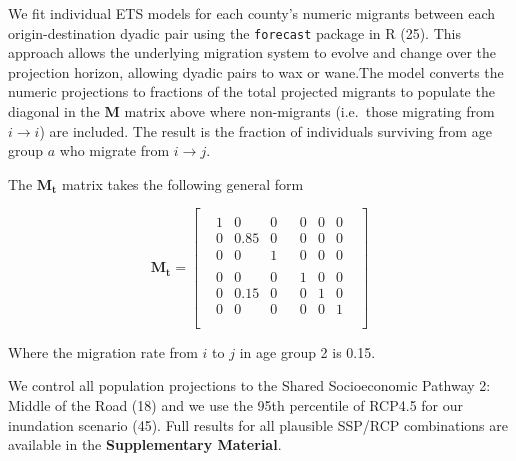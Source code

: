 \documentclass[9pt,twocolumn,twoside,]{pnas-new}
\begin{document}
We fit individual ETS models for each county's numeric migrants between
each origin-destination dyadic pair using the \texttt{forecast} package
in R (25). This approach allows the underlying migration system to
evolve and change over the projection horizon, allowing dyadic pairs to
wax or wane.The model converts the numeric projections to fractions of
the total projected migrants to populate the diagonal in the
\(\mathbf{M}\) matrix above where non-migrants (i.e.~those migrating
from \(i\rightarrow i\)) are included. The result is the fraction of
individuals surviving from age group \(a\) who migrate from
\(i\rightarrow j\).

The \(\mathbf{M_t}\) matrix takes the following general form

\begin{equation}
\mathbf{M_{t}} =
\begin{bmatrix}
\begin{array}{c|c}

\begin{matrix} 1 & 0 & 0 \\ 0 & 0.85 & 0 \\ 0 & 0 & 1 \end{matrix} &
\begin{matrix} 0 & 0 & 0 \\ 0 & 0 & 0 \\ 0 & 0 & 0 \end{matrix} \\
\hline
\begin{matrix} 0 & 0 & 0 \\ 0 & 0.15 & 0 \\ 0 & 0 & 0 \end{matrix} &
\begin{matrix} 1 & 0 & 0 \\ 0 & 1 & 0 \\ 0 & 0 & 1 \end{matrix} \\
\end{array}
\end{bmatrix}
\end{equation}

Where the migration rate from \(i\) to \(j\) in age group 2 is 0.15.

We control all population projections to the Shared Socioeconomic
Pathway 2: Middle of the Road (18) and we use the 95th percentile of
RCP4.5 for our inundation scenario (45). Full results for all plausible
SSP/RCP combinations are available in the \textbf{Supplementary
Material}.
\end{document}
